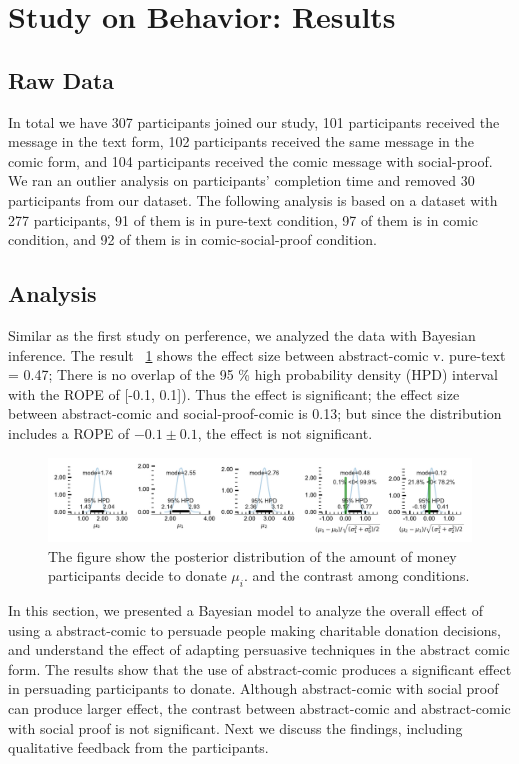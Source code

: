 \section{Study on Behavior: Results}
\label{sec:Study on Behavior Results}

\subsection{Raw Data}
\label{sub:Study on Behavior Raw Data}
In total we have 307 participants joined our study, 101 participants received the message in the text form, 102 participants received the same message in the comic form, and 104 participants received the comic message with social-proof. We ran an outlier analysis on participants' completion time and removed 30 participants from our dataset. The following analysis is based on a dataset with 277 participants, 91 of them is in pure-text condition, 97 of them is in comic condition, and 92 of them is in comic-social-proof condition.

\subsection{Analysis}
\label{sub:Study on Behavior Analysis}

Similar as the first study on perference, we analyzed the data with Bayesian inference. The result ~\ref{fig:main-experiment2-effect} shows the effect size between abstract-comic v. pure-text = 0.47; There is no overlap of the 95 \% high probability density (HPD) interval with the ROPE of [-0.1, 0.1]). Thus the effect is significant; the effect size between abstract-comic and social-proof-comic is 0.13; but since the distribution includes a ROPE of $-0.1 \pm 0.1$, the effect is not significant.

\begin{figure}
 \includegraphics[width=1\textwidth]{./hari-code/new_exp_text_v_comic_v_social.pdf}
 \caption{The figure show the posterior distribution of the amount of money participants decide to donate $\mu_i$. and the contrast among conditions.}
 \label{fig:main-experiment2-effect}
\end{figure}

In this section, we presented a Bayesian model to analyze the overall effect of using a abstract-comic to persuade people making charitable donation decisions, and understand the effect of adapting persuasive techniques in the abstract comic form. The results show that the use of abstract-comic produces a significant effect in persuading participants to donate. Although abstract-comic with social proof can produce larger effect, the contrast between abstract-comic and abstract-comic with social proof is not significant. Next we discuss the findings, including qualitative feedback from the participants.
